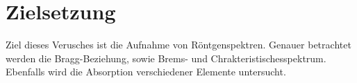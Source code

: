 \section{Zielsetzung}
\label{sec:Ziel}
Ziel dieses Verusches ist die Aufnahme von Röntgenspektren.
Genauer betrachtet werden die Bragg-Beziehung, sowie Brems- und Chrakteristischesspektrum.
Ebenfalls wird die Absorption verschiedener Elemente untersucht.
